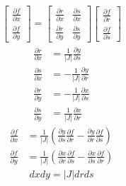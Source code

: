 \documentclass[11pt]{article}
\begin{document}
\begin{align}
\begin{bmatrix} \frac{\partial f}{\partial x} \\[5pt] \frac{\partial f}{\partial y} \end{bmatrix} = \begin{bmatrix}\frac{\partial r}{\partial x} & \frac{\partial s}{\partial x} \\[5pt] \frac{\partial r}{\partial y} & \frac{\partial s}{\partial y}\end{bmatrix}\begin{bmatrix} \frac{\partial f}{\partial r} \\[5pt] \frac{\partial f}{\partial s} \end{bmatrix}
\end{align}
\begin{align}
\frac{\partial r}{\partial x} &= \frac{1}{|J|} \frac{\partial y}{\partial s} \\
\frac{\partial s}{\partial x} &= -\frac{1}{|J|} \frac{\partial y}{\partial r} \\
\frac{\partial r}{\partial y} &= -\frac{1}{|J|} \frac{\partial x}{\partial s} \\
\frac{\partial s}{\partial y} &= \frac{1}{|J|} \frac{\partial x}{\partial r} 
\end{align}
\begin{align}
\frac{\partial f}{\partial x} &= \frac{1}{|J|}\left( \frac{\partial y}{\partial s}\frac{\partial f}{\partial r} - \frac{\partial y}{\partial r}\frac{\partial f}{\partial s} \right) \\
\frac{\partial f}{\partial y} &= \frac{1}{|J|}\left( \frac{\partial x}{\partial r}\frac{\partial f}{\partial s}- \frac{\partial x}{\partial s}\frac{\partial f}{\partial r} \right)
\end{align}
\begin{align}
dxdy = |J|drds
\end{align}
\end{document}
